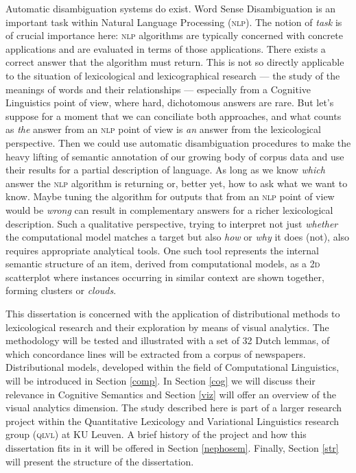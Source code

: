 \documentclass[
]{book}
\begin{document}
Automatic disambiguation systems do exist. Word Sense Disambiguation is an important task within Natural Language Processing (\textsc{nlp}). The notion of \emph{task} is of crucial importance here: \textsc{nlp} algorithms are typically concerned with concrete applications and are evaluated in terms of those applications. There exists a correct answer that the algorithm must return. This is not so directly applicable to the situation of lexicological and lexicographical research --- the study of the meanings of words and their relationships --- especially from a Cognitive Linguistics point of view, where hard, dichotomous answers are rare. But let's suppose for a moment that we can conciliate both approaches, and what counts as \emph{the} answer from an \textsc{nlp} point of view is \emph{an} answer from the lexicological perspective. Then we could use automatic disambiguation procedures to make the heavy lifting of semantic annotation of our growing body of corpus data and use their results for a partial description of language. As long as we know \emph{which} answer the \textsc{nlp} algorithm is returning or, better yet, how to ask what we want to know. Maybe tuning the algorithm for outputs that from an \textsc{nlp} point of view would be \emph{wrong} can result in complementary answers for a richer lexicological description. Such a qualitative perspective, trying to interpret not just \emph{whether} the computational model matches a target but also \emph{how} or \emph{why} it does (not), also requires appropriate analytical tools. One such tool represents the internal semantic structure of an item, derived from computational models, as a \textsc{2d} scatterplot where instances occurring in similar context are shown together, forming clusters or \emph{clouds}.

This dissertation is concerned with the application of distributional methods to lexicological research and their exploration by means of visual analytics. The methodology will be tested and illustrated with a set of 32 Dutch lemmas, of which concordance lines will be extracted from a corpus of newspapers.
Distributional models, developed within the field of Computational Linguistics, will be introduced in Section \ref{comp}. In Section \ref{cog} we will discuss their relevance in Cognitive Semantics and Section \ref{viz} will offer an overview of the visual analytics dimension.
The study described here is part of a larger research project within the Quantitative Lexicology and Variational Linguistics research group (\textsc{qlvl}) at KU Leuven. A brief history of the project and how this dissertation fits in it will be offered in Section \ref{nephosem}. Finally, Section \ref{str} will present the structure of the dissertation.
\end{document}
